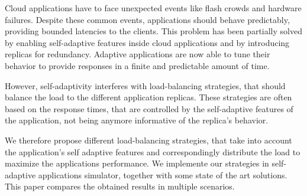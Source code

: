 Cloud applications have to face unexpected events like flash crowds
and hardware failures. Despite these common events, applications
should behave predictably, providing bounded latencies to the
clients. This problem has been partially solved by enabling
self-adaptive features inside cloud applications and by introducing
replicas for redundancy. Adaptive applications are now able to tune
their behavior to provide responses in a finite and predictable amount
of time.

However, self-adaptivity interferes with load-balancing strategies,
that should balance the load to the different application
replicas. These strategies are often based on the response times, that
are controlled by the self-adaptive features of the application, not
being anymore informative of the replica's behavior.

We therefore propose different load-balancing strategies, that take
into account the application's self adaptive features and
correspondingly distribute the load to maximize the applications
performance. We implemente our strategies in self-adaptive
applications simulator, together with some state of the art
solutions. This paper compares the obtained results in multiple
scenarios.

